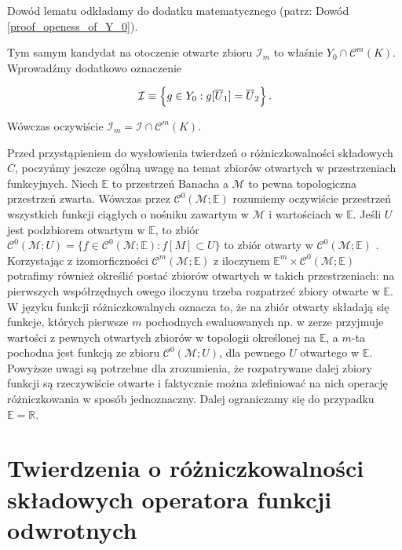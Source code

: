 Dowód lematu odkładamy do dodatku matematycznego (patrz: Dowód \ref{proof_openess_of_Y_0}). 

	Tym samym kandydat na otoczenie otwarte zbioru $\mathcal{I}_{m}$ to właśnie $Y_0 \cap \mathcal{C}^{m}(K)$. Wprowadźmy dodatkowo oznaczenie 
	
\begin{equation*}
	\mathcal{I} \equiv \Bigl \{ g \in Y_0 : g[\overline{U}_1] = \overline{U}_2 \Bigl \}\,.
\end{equation*}

Wówczas oczywiście $\mathcal{I}_{m} = \mathcal{I} \cap \mathcal{C}^{m}(K)$. 

Przed przystąpieniem do wysłowienia twierdzeń o różniczkowalności składowych $C$, poczyńmy jeszcze ogólną uwagę na temat zbiorów otwartych w przestrzeniach funkcyjnych. Niech $\mathbb{E}$ to przestrzeń Banacha a $\mathcal{M}$ to pewna topologiczna przestrzeń zwarta. Wówczas przez $\mathcal{C}^{0}(\mathcal{M}; \mathbb{E})$ rozumiemy oczywiście przestrzeń wszystkich funkcji ciągłych o nośniku zawartym w $\mathcal{M}$ i wartościach w $\mathbb{E}$. Jeśli $U$ jest podzbiorem otwartym w $\mathbb{E}$, to zbiór $\mathcal{C}^{0}(\mathcal{M}; U) = \{ f \in \mathcal{C}^{0}(\mathcal{M}; \mathbb{E}): f[M] \subset U \}$ to zbiór otwarty w $\mathcal{C}^{0}(\mathcal{M}; \mathbb{E})$ \citep[patrz:][str. 91]{Mardsen}. Korzystając z izomorficzności $\mathcal{C}^{m}(\mathcal{M}; \mathbb{E})$ z iloczynem $\mathbb{E}^{m} \times \mathcal{C}^{0}(\mathcal{M}; \mathbb{E})$ potrafimy również określić postać zbiorów otwartych w takich przestrzeniach: na pierwszych współrzędnych owego iloczynu trzeba rozpatrzeć zbiory otwarte w $\mathbb{E}$. W języku funkcji różniczkowalnych oznacza to, że na zbiór otwarty składają się funkcje, których pierwsze $m$ pochodnych ewaluowanych np. w zerze przyjmuje wartości z pewnych otwartych zbiorów w topologii określonej na $\mathbb{E}$, a $m$-ta pochodna jest funkcją ze zbioru $\mathcal{C}^{0}(\mathcal{M}; U)$, dla pewnego $U$ otwartego w $\mathbb{E}$. Powyższe uwagi są potrzebne dla zrozumienia, że rozpatrywane dalej zbiory funkcji są rzeczywiście otwarte i faktycznie można zdefiniować na nich operację różniczkowania w sposób jednoznaczny. Dalej ograniczamy się do przypadku $\mathbb{E}=\mathbb{R}$.

\section{Twierdzenia o różniczkowalności składowych operatora funkcji odwrotnych}

